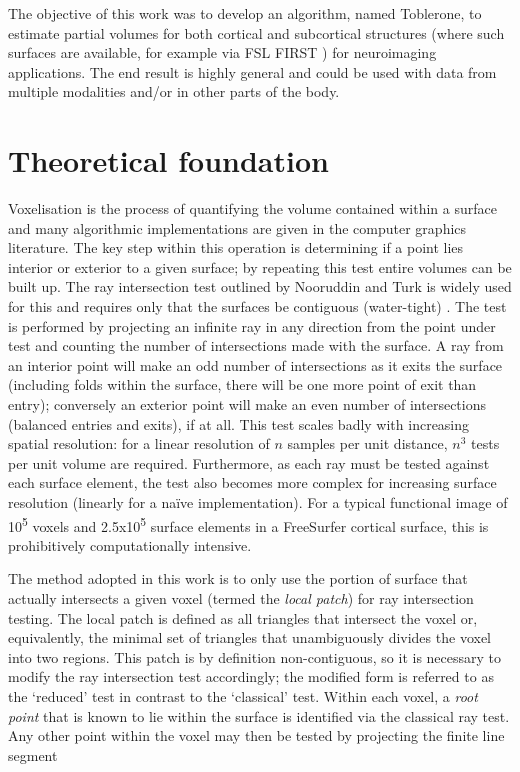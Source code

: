 \documentclass[12pt]{report}
\begin{document}
The objective of this work was to develop an algorithm, named Toblerone, to estimate partial volumes for both cortical and subcortical structures (where such surfaces are available, for example via FSL FIRST \cite{Patenaude2011}) for neuroimaging applications. The end result is highly general and could be used with data from multiple modalities and/or in other parts of the body. 

\section{Theoretical foundation}

Voxelisation is the process of quantifying the volume contained within a surface and many algorithmic implementations are given in the computer graphics literature. The key step within this operation is determining if a point lies interior or exterior to a given surface; by repeating this test entire volumes can be built up. The ray intersection test outlined by Nooruddin and Turk is widely used for this and requires only that the surfaces be contiguous (water-tight) \cite{Nooruddin2003}. The test is performed by projecting an infinite ray in any direction from the point under test and counting the number of intersections made with the surface. A ray from an interior point will make an odd number of intersections as it exits the surface (including folds within the surface, there will be one more point of exit than entry); conversely an exterior point will make an even number of intersections (balanced entries and exits), if at all. This test scales badly with increasing spatial resolution: for a linear resolution of $n$ samples per unit distance, $n^3$ tests per unit volume are required. Furthermore, as each ray must be tested against each surface element, the test also becomes more complex for increasing surface resolution (linearly for a naïve implementation). For a typical functional image of 10\textsuperscript{5} voxels and 2.5x10\textsuperscript{5} surface elements in a FreeSurfer cortical surface, this is prohibitively computationally intensive.

The method adopted in this work is to only use the portion of surface that actually intersects a given voxel (termed the \textit{local patch}) for ray intersection testing. The local patch is defined as all triangles that intersect the voxel or, equivalently, the minimal set of triangles that unambiguously divides the voxel into two regions. This patch is by definition non-contiguous, so it is necessary to modify the ray intersection test accordingly; the modified form is referred to as the ‘reduced’ test in contrast to the ‘classical’ test. Within each voxel, a \textit{root point} that is known to lie within the surface is identified via the classical ray test. Any other point within the voxel may then be tested by projecting the finite line segment 
\end{document}
